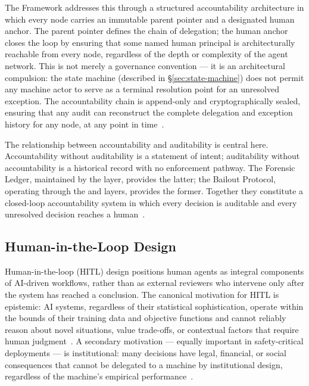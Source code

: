 The \bxthree{} Framework addresses this through a structured accountability architecture in which every node carries an immutable parent pointer and a designated human anchor. The parent pointer defines the chain of delegation; the human anchor closes the loop by ensuring that some named human principal is architecturally reachable from every node, regardless of the depth or complexity of the agent network. This is not merely a governance convention — it is an architectural compulsion: the \bxthree{} state machine (described in \S\ref{sec:state-machine}) does not permit any machine actor to serve as a terminal resolution point for an unresolved exception. The accountability chain is append-only and cryptographically sealed, ensuring that any audit can reconstruct the complete delegation and exception history for any node, at any point in time~\cite{wiener1948}.

The relationship between accountability and auditability is central here. Accountability without auditability is a statement of intent; auditability without accountability is a historical record with no enforcement pathway. The \bxthree{} Forensic Ledger, maintained by the \fact{} layer, provides the latter; the Bailout Protocol, operating through the \purpose{} and \bounds{} layers, provides the former. Together they constitute a closed-loop accountability system in which every decision is auditable and every unresolved decision reaches a human~\cite{bansal2019}.

\subsection{Human-in-the-Loop Design}
\label{sec:hitl}

Human-in-the-loop (HITL) design positions human agents as integral components of AI-driven workflows, rather than as external reviewers who intervene only after the system has reached a conclusion. The canonical motivation for HITL is epistemic: AI systems, regardless of their statistical sophistication, operate within the bounds of their training data and objective functions and cannot reliably reason about novel situations, value trade-offs, or contextual factors that require human judgment~\cite{tristr81}. A secondary motivation — equally important in safety-critical deployments — is institutional: many decisions have legal, financial, or social consequences that cannot be delegated to a machine by institutional design, regardless of the machine's empirical performance~\cite{bansal2019}.

